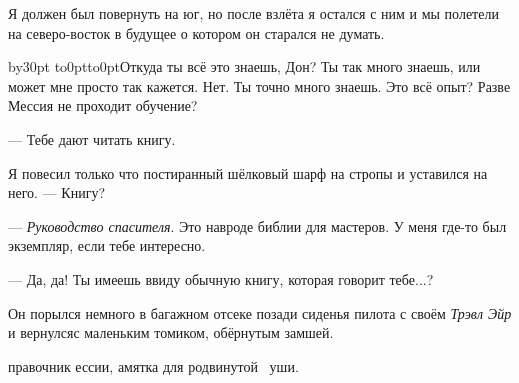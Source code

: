 Я должен был повернуть на юг, но после взлёта я остался с ним и мы полетели на северо-восток
в будущее о котором он старался не думать.

\vfil\eject

{}
\vskip3cm

\begingroup{}
\def\par{\endgraf\endgroup}
\advance\parindent by30pt \hang{}
\noindent\vtop to0pt{\kern-8pt\hbox to0pt{\hss\kern\parindent\bukvfont О\kern3pt}\vss}ткуда
ты всё это знаешь, Дон? Ты так много знаешь, или может мне просто так кажется. Нет.
Ты точно много знаешь. Это всё опыт? Разве Мессия не проходит обучение?

--- Тебе дают читать книгу.

Я повесил только что постиранный шёлковый шарф на стропы и уставился на него. --- Книгу?

--- {\sl Руководство спасителя}. Это навроде библии для мастеров.
У меня где-то был экземпляр, если тебе интересно.

--- Да, да! Ты имеешь ввиду обычную книгу, которая говорит тебе...?

Он порылся немного в багажном отсеке позади сиденья пилота с своём {\it Трэвл Эйр\/}
и вернулсяс маленьким томиком, обёрнутым замшей.

\vskip35pt
{\bookfont {}правочник ессии,}\par
\vskip13pt
\vskip13pt
{\bookfont {}амятка для родвинутой}
\vskip7pt
\hbox{\kern3.5cm \bookfont{}уши.}

\bye
